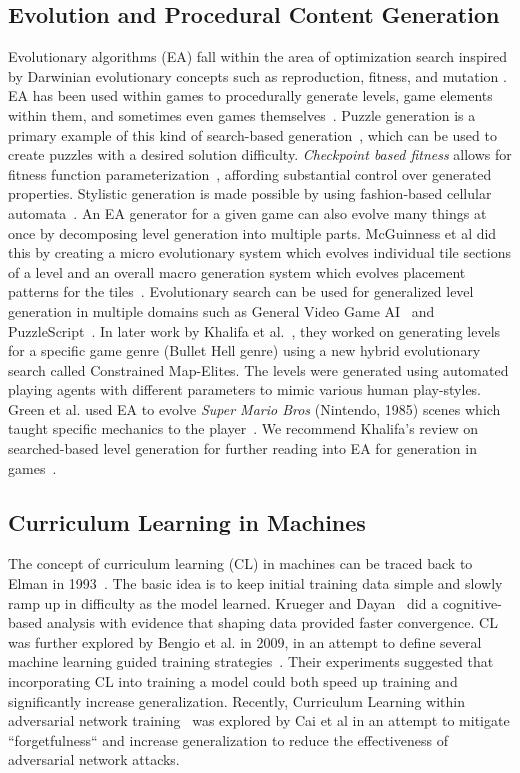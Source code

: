 \documentclass[letterpaper]{article} %
\begin{document}
\subsection{Evolution and Procedural Content Generation}
Evolutionary algorithms (EA) fall within the area of optimization search inspired by Darwinian evolutionary concepts such as reproduction, fitness, and mutation \cite{togelius2016introduction}. EA has been used within games to procedurally generate levels, game elements within them, and sometimes even games themselves~\cite{khalifa2017general}. Puzzle generation is a primary example of this kind of search-based generation~\cite{ashlock2010automatic}, which can be used to create puzzles with a desired solution difficulty. \emph{Checkpoint based fitness} allows for fitness function parameterization~\cite{ashlock2011search}, affording substantial control over generated properties. Stylistic generation is made possible by using fashion-based cellular automata~\cite{ashlock2015evolvable}. An EA generator for a given game can also evolve many things at once by decomposing level generation into multiple parts. McGuinness et al did this by creating a micro evolutionary system which evolves individual tile sections of a level and an overall macro generation system which evolves placement patterns for the tiles~\cite{mcguinness2011decomposing}. 
Evolutionary search can be used for generalized level generation in multiple domains such as General Video Game AI~\cite{khalifa2016general} and PuzzleScript~\cite{khalifa2015automatic}. In later work by Khalifa et al.~\cite{khalifa2018talakat}, they worked on generating levels for a specific game genre (Bullet Hell genre) using a new hybrid evolutionary search called Constrained Map-Elites. The levels were generated using automated playing agents with different parameters to mimic various human play-styles. Green et al. used EA to evolve \emph{Super Mario Bros} (Nintendo, 1985) scenes which taught specific mechanics to the player~\cite{green2018generating}.
We recommend Khalifa's review on searched-based level generation for further reading into EA for generation in games~\cite{khalifa2015literature}.

\subsection{Curriculum Learning in Machines}
The concept of curriculum learning (CL) in machines can be traced back to Elman in 1993~\cite{elman1993learning}. The basic idea is to keep initial training data simple and slowly ramp up in difficulty as the model learned.  Krueger and Dayan~\cite{krueger2009flexible} did a cognitive-based analysis with evidence that shaping data provided faster convergence. CL was further explored by Bengio et al. in 2009, in an attempt to define several machine learning guided training strategies~\cite{bengio2009curriculum}. Their experiments suggested that incorporating CL into training a model could both speed up training and significantly increase generalization. Recently, Curriculum Learning within adversarial network training~\cite{cai2018curriculum} was explored by Cai et al in an attempt to mitigate ``forgetfulness`` and increase generalization to reduce the effectiveness of adversarial network attacks. 
\end{document}
